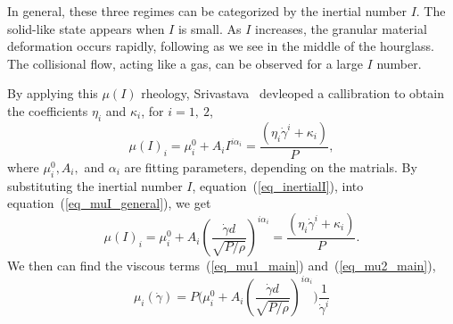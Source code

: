 \par
In general, these three regimes can be categorized by the inertial number $I$. The solid-like state appears when $I$ is small. As $I$ increases, the granular material deformation occurs rapidly, following as we see in the middle of the hourglass. The collisional flow, acting like a gas, can be observed for a large $I$ number. 
\par
By applying this $\mu(I)$ rheology, Srivastava~\cite{srivastava_viscometric_2021} devleoped a callibration to obtain the coefficients $\eta_i$ and $\kappa_i$, for $i = 1, \ 2$,
\begin{equation}
  \mu(I)_i = \mu_i^0 + A_i{ I}^{ i \alpha_i} =  \frac{(\eta_i \dot{\gamma}^i + \kappa_i)}{P},
\label{eq_muI_general}
\end{equation}
where $\mu_i^0, A_i,$ and $\alpha_i$ are fitting parameters, depending on the matrials. 
By substituting the inertial number $I$, equation~(\ref{eq_inertialI}), into equation~(\ref{eq_muI_general}),
we get
\begin{equation}
  \mu(I)_i = \mu_i^0 + A_i {\left(  \frac{\dot{\gamma} d }{\sqrt{P/\rho}}\right) }^{ i \alpha_i} =  \frac{(\eta_i \dot{\gamma}^i + \kappa_i)}{P}.
\label{eq_muI_I}
\end{equation}
We then can find the viscous terms~(\ref{eq_mu1_main}) and~(\ref{eq_mu2_main}),
\begin{equation}
  \mu_i  (\dot{\gamma})= 
 P \Biggl( \mu_i^0 + A_i {\left(  \frac{\dot{\gamma} d }{\sqrt{P/\rho}}\right) }^{ i \alpha_i}\Biggr) 
   \frac{1}{\dot{\gamma}^i}
\label{eq_eta1}
\end{equation}

